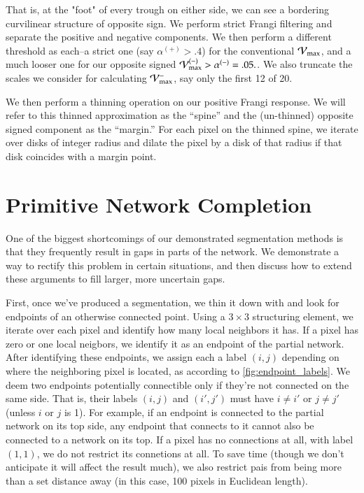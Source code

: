 That is, at the "foot" of every trough on either side, we can see a bordering curvilinear structure of opposite sign. We perform strict Frangi filtering and separate the positive and negative components. We then perform a different threshold as each--a strict one (say $\alpha^{(+)} > .4$) for the conventional $\mathcal{V}_{\max}$, and a much looser one for our opposite signed $\mathcal{V}_{\max}^{(-)} > \alpha^{(-)} = .05.$. We also truncate the scales we consider for calculating $\mathcal{V}_{\max}^{-}$, say only the first 12 of 20.

We then perform a thinning operation on our positive Frangi response. We will refer to this thinned approximation as the ``spine'' and the (un-thinned) opposite signed component as the ``margin.'' For each pixel on the thinned spine, we iterate over disks of integer radius and dilate the pixel by a disk of that radius if that disk coincides with a margin point. 

\section{Primitive Network Completion}

One of the biggest shortcomings of our demonstrated segmentation methods is that they frequently result in gaps in parts of the network. We demonstrate a way to rectify this problem in certain situations, and then discuss how to extend these arguments to fill larger, more uncertain gaps.

First, once we've produced a segmentation, we thin it down with \cite{thinning} and look for endpoints of an otherwise connected point. Using a $3\times 3$ structuring element, we iterate over each pixel and identify how many local neighbors it has. If a pixel has zero or one local neigbors, we identify it as an endpoint of the partial network. After identifying these endpoints, we assign each a label $(i,j)$ depending on where the neighboring pixel is located, as according to \cref{fig:endpoint_labels}. We deem two endpoints potentially connectible only if they're not connected on the same side. That is, their labels $(i,j)$ and $(i',j')$ must have $i\ne i'$ or $j\ne j'$ (unless $i$ or $j$ is 1). For example, if an endpoint is connected to the partial network on its top side, any endpoint that connects to it cannot also be connected to a network on its top. If a pixel has no connections at all, with label $(1,1)$, we do not restrict its connetions at all. To save time (though we don't anticipate it will affect the result much), we also restrict pais from being more than a set distance away (in this case, 100 pixels in Euclidean length).

